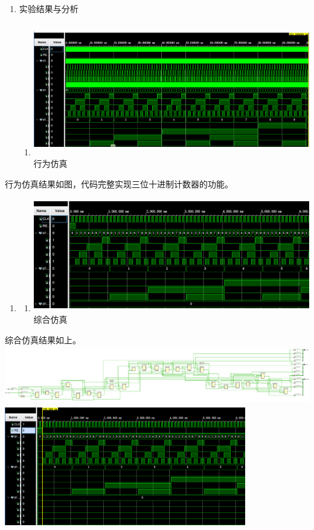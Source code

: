 \documentclass{article} %
\begin{document}
\begin{enumerate}
    \item  实验结果与分析

          \begin{enumerate}
              \item  \includegraphics*[width=5.40in, height=2.27in]{image3}行为仿真
          \end{enumerate}
\end{enumerate}

\noindent 行为仿真结果如图，代码完整实现三位十进制计数器的功能。

\begin{enumerate}
    \item \begin{enumerate}
              \item  \includegraphics*[width=5.00in, height=1.94in]{image4}综合仿真
          \end{enumerate}
\end{enumerate}



综合仿真结果如上。\includegraphics*[width=5.78in, height=1.01in]{image5}\includegraphics*[width=4.15in, height=2.04in]{image6}
\end{document}
